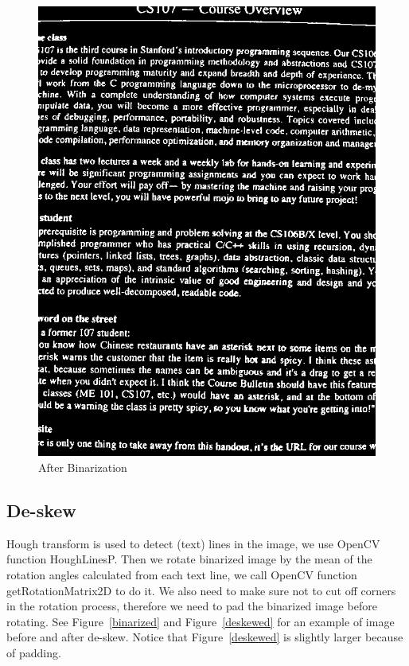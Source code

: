 \documentclass[conference]{IEEEtran}
\begin{document}
\begin{figure}
\center
\includegraphics[scale=0.25]{no_skew_binarized.jpg}
\caption{After Binarization}
\label{noskewbinarized}
\end{figure}

\subsection{De-skew}

Hough transform is used to detect (text) lines in the image, we use OpenCV function HoughLinesP.  Then we rotate binarized image by the mean of the rotation angles calculated from each text line, we call OpenCV function getRotationMatrix2D to do it.  We also need to make sure not to cut off corners in the rotation process, therefore we need to pad the binarized image before rotating.  See Figure~\ref{binarized} and Figure~\ref{deskewed} for an example of image before and after de-skew.  Notice that Figure~\ref{deskewed} is slightly larger because of padding.
\end{document}
